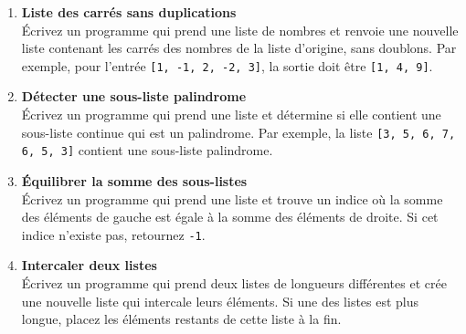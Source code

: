\begin{enumerate}
    \item \textbf{Liste des carrés sans duplications} \\
    Écrivez un programme qui prend une liste de nombres et renvoie une nouvelle liste contenant les carrés des nombres de la liste d'origine, sans doublons. Par exemple, pour l'entrée \texttt{[1, -1, 2, -2, 3]}, la sortie doit être \texttt{[1, 4, 9]}.

    \item \textbf{Détecter une sous-liste palindrome} \\
    Écrivez un programme qui prend une liste et détermine si elle contient une sous-liste continue qui est un palindrome. Par exemple, la liste \texttt{[3, 5, 6, 7, 6, 5, 3]} contient une sous-liste palindrome.

    \item \textbf{Équilibrer la somme des sous-listes} \\
    Écrivez un programme qui prend une liste et trouve un indice où la somme des éléments de gauche est égale à la somme des éléments de droite. Si cet indice n'existe pas, retournez \texttt{-1}. 

    \item \textbf{Intercaler deux listes} \\
    Écrivez un programme qui prend deux listes de longueurs différentes et crée une nouvelle liste qui intercale leurs éléments. Si une des listes est plus longue, placez les éléments restants de cette liste à la fin.

\end{enumerate}
